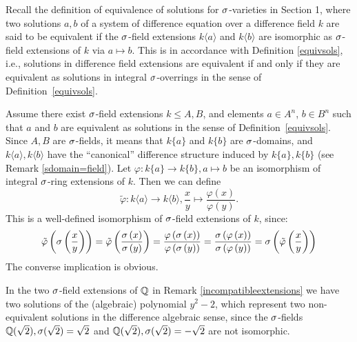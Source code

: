 
\begin{rem}
Recall the definition of equivalence of solutions for $\sigma$-varieties in Section 1, where two solutions $a,b$ of a system of difference equation over a difference field $k$ are said to be equivalent if the $\sigma$-field extensions $k\langle a \rangle$ and $k\langle b \rangle$ are isomorphic as $\sigma$-field extensions of $k$ via $a \mapsto b$.
This is in accordance with Definition \ref{equivsols}, i.e., solutions in difference field extensions are equivalent if and only if they are equivalent as solutions in integral $\sigma$-overrings in the sense of Definition~\ref{equivsols}.
\begin{bew}
Assume there exist $\sigma$-field extensions $k \leq A,B$, and elements $a \in A^n$, $b \in B^n$ such that $a$ and $b$ are equivalent as solutions in the sense of Definition~\ref{equivsols}. Since $A,B$ are $\sigma$-fields, it means that $k\{a\}$ and $k\{b\}$ are $\sigma$-domains, 
and $k\langle a \rangle, k\langle b \rangle$ have the ``canonical'' difference structure induced by $k\{a\}, k\{b\}$ (see Remark \ref{sdomain=field}). Let $\varphi: k\{a\} \rightarrow k\{b\}, a \mapsto b$ be an isomorphism of integral $\sigma$-ring extensions of $k$.
Then we can define $$\tilde \varphi: k \langle a \rangle \rightarrow k\langle b \rangle, \frac{x}{y} \mapsto \frac{\varphi(x)}{\varphi{(y)}}.$$ This is a well-defined isomorphism of $\sigma$-field extensions of $k$, since:
\begin{align*}
\tilde \varphi \left(\sigma \left(\frac{x}{y}\right)\right) = \tilde \varphi \left( \frac{\sigma \left(x\right)}{\sigma \left(y\right)}\right) = \frac{ \varphi \left(\sigma \left(x\right)\right)}{ \varphi \left(\sigma \left(y\right)\right)} =  \frac{\sigma \left(\varphi \left(x\right)\right)}{\sigma \left(\varphi \left(y\right)\right)} = \sigma \left( \tilde \varphi \left(\frac{x}{y}\right)\right)
\end{align*}
The converse implication is obvious.
\end{bew}
\end{rem}

\begin{ex}
In the two $\sigma$-field extensions of $\mathbb{Q}$ in Remark \ref{incompatibleextensions} we have two solutions of the (algebraic) polynomial $y^2-2$, which represent two non-equivalent solutions in the difference algebraic sense,
since the $\sigma$-fields $\mathbb{Q}(\sqrt{2}), \sigma(\sqrt{2}) = \sqrt{2}$ and $\mathbb{Q}(\sqrt{2}), \sigma(\sqrt{2}) = -\sqrt{2}$ are not isomorphic. 
\end{ex}


